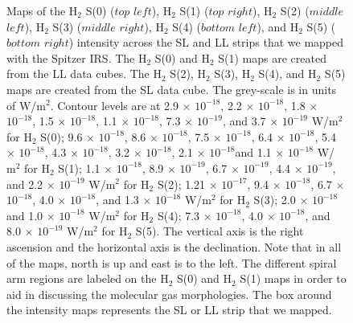 \documentclass[manuscript]{aastex}
\begin{document}
\begin{figure}
\caption{Maps of the $\mathrm{H_2}$ S(0) ($top$ $left$), $\mathrm{H_2}$ S(1)
 ($top$ $right$), $\mathrm{H_2}$ S(2) ($middle$ $left$), $\mathrm{H_2}$ S(3) 
 ($middle$ $right$), $\mathrm{H_2}$ S(4) ($bottom$ $left$), and $\mathrm{H_2}$ 
 S(5) ($bottom$ $right$) intensity across the SL and LL strips that we mapped 
 with the Spitzer IRS.  The $\mathrm{H_2}$ S(0) and $\mathrm{H_2}$ S(1) 
 maps are created from the LL data cubes.    
The $\mathrm{H_2}$ S(2), $\mathrm{H_2}$ S(3), $\mathrm{H_2}$ S(4), and 
$\mathrm{H_2}$ S(5) maps are created from the SL data cube.  
The grey-scale is in units of W/$\mathrm{m^2}$.  Contour levels are at 2.9 
$\times$ ${10^{-18}}$, 2.2 $\times$ ${10^{-18}}$, 1.8 $\times$ ${10^{-18}}$, 
1.5 $\times$ ${10^{-18}}$, 1.1 $\times$ ${10^{-18}}$, 7.3 $\times$ ${10^{-19}}$, 
and 3.7 $\times$ ${10^{-19}}$ W/$\mathrm{m^2}$ for $\mathrm{H_2}$ S(0); 9.6 
$\times$ ${10^{-18}}$, 8.6 $\times$ ${10^{-18}}$, 7.5 $\times$ ${10^{-18}}$, 6.4
 $\times$ ${10^{-18}}$, 5.4 $\times$ ${10^{-18}}$, 4.3 $\times$ ${10^{-18}}$, 3.2
  $\times$ ${10^{-18}}$, 2.1 $\times$ ${10^{-18}}$and 1.1 $\times$ ${10^{-18}}$ 
  W/$\mathrm{m^2}$ for $\mathrm{H_2}$ S(1); 1.1 $\times$ ${10^{-18}}$, 8.9 
  $\times$ ${10^{-19}}$, 6.7 $\times$ ${10^{-19}}$, 4.4 $\times$ ${10^{-19}}$, and 
  2.2 $\times$ ${10^{-19}}$ W/$\mathrm{m^2}$ for $\mathrm{H_2}$ S(2); 1.21 
  $\times$ ${10^{-17}}$, 9.4 $\times$ ${10^{-18}}$, 6.7 $\times$ ${10^{-18}}$, 
  4.0 $\times$ ${10^{-18}}$, and 1.3 $\times$ ${10^{-18}}$ W/$\mathrm{m^2}$ 
  for $\mathrm{H_2}$ S(3);  2.0 $\times$ ${10^{-18}}$and 1.0 $\times$ ${10^{-18}}$ 
  W/$\mathrm{m^2}$ for $\mathrm{H_2}$ S(4); 7.3 $\times$ ${10^{-18}}$, 4.0 $\times$ 
  ${10^{-18}}$, and 8.0 $\times$ ${10^{-19}}$ W/$\mathrm{m^2}$ for $\mathrm{H_2}$ S(5).  
  The vertical axis is the right ascension and the horizontal axis is the declination.  
  Note that in all of the maps, north is up and east is to the left.  The different spiral 
  arm regions are labeled on the $\mathrm{H_2}$ S(0) and $\mathrm{H_2}$ S(1) 
  maps in order to aid in discussing the molecular gas morphologies.  The box around 
  the intensity maps represents the SL or LL strip that we mapped.}


\end{figure}
\clearpage
\end{document}
